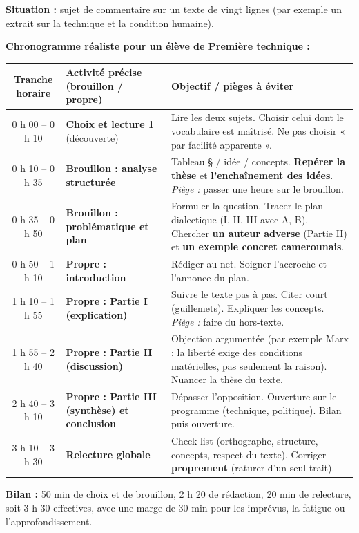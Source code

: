 \documentclass[11pt]{article}
\begin{document}
\begin{exoresolu}
\textbf{Situation :} sujet de commentaire sur un texte de vingt lignes (par exemple un extrait sur la technique et la condition humaine).

\tcblower
\textbf{Chronogramme réaliste pour un élève de Première technique :}

\begin{center}
\begin{tabularx}{\linewidth}{|c|X|X|}\hline
\textbf{Tranche horaire} & \textbf{Activité précise (brouillon / propre)} & \textbf{Objectif / pièges à éviter} \\ \hline
0 h 00 -- 0 h 10 & \textbf{Choix et lecture 1} (découverte) & Lire les deux sujets. Choisir celui dont le vocabulaire est maîtrisé. Ne pas choisir « par facilité apparente ». \\ \hline
0 h 10 -- 0 h 35 & \textbf{Brouillon : analyse structurée} & Tableau § / idée / concepts. \textbf{Repérer la thèse} et \textbf{l'enchaînement des idées}. \textit{Piège :} passer une heure sur le brouillon. \\ \hline
0 h 35 -- 0 h 50 & \textbf{Brouillon : problématique et plan} & Formuler la question. Tracer le plan dialectique (I, II, III avec A, B). Chercher \textbf{un auteur adverse} (Partie II) et \textbf{un exemple concret camerounais}. \\ \hline
0 h 50 -- 1 h 10 & \textbf{Propre : introduction} & Rédiger au net. Soigner l'accroche et l'annonce du plan. \\ \hline
1 h 10 -- 1 h 55 & \textbf{Propre : Partie I (explication)} & Suivre le texte pas à pas. Citer court (guillemets). Expliquer les concepts. \textit{Piège :} faire du hors-texte. \\ \hline
1 h 55 -- 2 h 40 & \textbf{Propre : Partie II (discussion)} & Objection argumentée (par exemple Marx : la liberté exige des conditions matérielles, pas seulement la raison). Nuancer la thèse du texte. \\ \hline
2 h 40 -- 3 h 10 & \textbf{Propre : Partie III (synthèse) et conclusion} & Dépasser l'opposition. Ouverture sur le programme (technique, politique). Bilan puis ouverture. \\ \hline
3 h 10 -- 3 h 30 & \textbf{Relecture globale} & Check-list (orthographe, structure, concepts, respect du texte). Corriger \textbf{proprement} (raturer d'un seul trait). \\ \hline
\end{tabularx}
\end{center}

\textbf{Bilan :} 50 min de choix et de brouillon, 2 h 20 de rédaction, 20 min de relecture, soit 3 h 30 effectives, avec une marge de 30 min pour les imprévus, la fatigue ou l'approfondissement.
\end{exoresolu}
\end{document}
